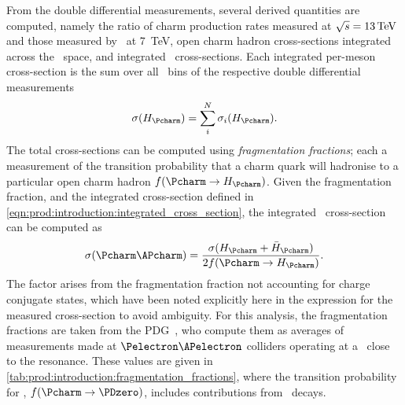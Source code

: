 From the double differential measurements, several derived quantities are 
computed, namely the ratio of charm production rates measured at $\sqrts = 
\SI{13}{\TeV}$ and those measured by \lhcb\ at \SI{7}{\TeV}, open charm hadron 
cross-sections integrated across the \pTy\ space, and integrated \ccbar\ 
cross-sections.
Each integrated per-meson cross-section is the sum over all \pTy\ bins of the 
respective double differential measurements
\begin{equation}
  \xsec{(\PHc)} =
    \sum_{i}^{N} \xsec_{i}(\PHc).
  \label{eqn:prod:introduction:integrated_cross_section}
\end{equation}
The total \ccbar cross-sections can be computed using \emph{fragmentation 
  fractions}; each a measurement of the transition probability that a charm 
quark will hadronise to a particular open charm hadron $f(\cToHc)$.
Given the fragmentation fraction, and the integrated cross-section defined in 
\cref{eqn:prod:introduction:integrated_cross_section}, the integrated \ccbar\ 
cross-section can be computed as
\begin{equation}
  \xsec{(\ccbar)} = \frac{\xsec(\PHc + \APHc)}{2f(\cToHc)}.
  \label{eqn:prod:introduction:ccbar_cross_section}
\end{equation}
The factor \sfrac{1}{2} arises from the fragmentation fraction not accounting 
for charge conjugate states, which have been noted explicitly here in the 
expression for the measured cross-section to avoid ambiguity.
For this analysis, the fragmentation fractions are taken from the 
\ac{PDG}~\cite{PDG2008}, who compute them as averages of measurements made at 
$\Pelectron\APelectron$ colliders operating at a \sqrts\ close to the 
\PUpsilonFourS resonance.
These values are given in \cref{tab:prod:introduction:fragmentation_fractions}, 
where the transition probability for \PDzero, $f(\decay{\Pcharm}{\PDzero})$, 
includes contributions from \DstToDzpi\ decays.

\begin{table}
  \caption[Charm hadron fragmentation fractions]{%
    Charm hadron fragmentation fractions~\cite{PDG2008}.
    Here, \PHc does not include the charge conjugate state.
  }
  \label{tab:prod:introduction:fragmentation_fractions}
  \centering
  
\end{table}

